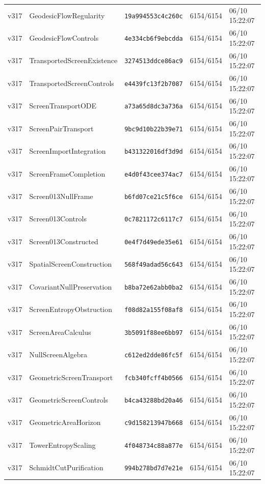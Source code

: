 \documentclass[11pt]{article}
\theoremstyle{definition}\newtheorem{deriv}{Derivação}
\begin{document}
{\begin{longtable}{@{}lllll@{}}
v317 & GeodesicFlowRegularity & \texttt{19a994553c4c260c} & 6154/6154 & 06/10 15:22:07 \\
v317 & GeodesicFlowControls & \texttt{4e334cb6f9ebcdda} & 6154/6154 & 06/10 15:22:07 \\
v317 & TransportedScreenExistence & \texttt{3274513ddce86ac9} & 6154/6154 & 06/10 15:22:07 \\
v317 & TransportedScreenControls & \texttt{e4439fc13f2b7087} & 6154/6154 & 06/10 15:22:07 \\
v317 & ScreenTransportODE & \texttt{a73a65d8dc3a736a} & 6154/6154 & 06/10 15:22:07 \\
v317 & ScreenPairTransport & \texttt{9bc9d10b22b39e71} & 6154/6154 & 06/10 15:22:07 \\
v317 & ScreenImportIntegration & \texttt{b431322016df3d9d} & 6154/6154 & 06/10 15:22:07 \\
v317 & ScreenFrameCompletion & \texttt{e4d0f43cee374ac7} & 6154/6154 & 06/10 15:22:07 \\
v317 & Screen013NullFrame & \texttt{b6fd07ce21c5f6ce} & 6154/6154 & 06/10 15:22:07 \\
v317 & Screen013Controls & \texttt{0c7821172c6117c7} & 6154/6154 & 06/10 15:22:07 \\
v317 & Screen013Constructed & \texttt{0e4f7d49ede35e61} & 6154/6154 & 06/10 15:22:07 \\
v317 & SpatialScreenConstruction & \texttt{568f49adad56c643} & 6154/6154 & 06/10 15:22:07 \\
v317 & CovariantNullPreservation & \texttt{b8ba72e62abb0ba2} & 6154/6154 & 06/10 15:22:07 \\
v317 & ScreenEntropyObstruction & \texttt{f08d82a155f08af8} & 6154/6154 & 06/10 15:22:07 \\
v317 & ScreenAreaCalculus & \texttt{3b5091f88ee6bb97} & 6154/6154 & 06/10 15:22:07 \\
v317 & NullScreenAlgebra & \texttt{c612ed2dde86fc5f} & 6154/6154 & 06/10 15:22:07 \\
v317 & GeometricScreenTransport & \texttt{fcb340fcff4b0566} & 6154/6154 & 06/10 15:22:07 \\
v317 & GeometricScreenControls & \texttt{b4ca43288bd20a46} & 6154/6154 & 06/10 15:22:07 \\
v317 & GeometricAreaHorizon & \texttt{c9d158213947b668} & 6154/6154 & 06/10 15:22:07 \\
v317 & TowerEntropyScaling & \texttt{4f048734c88a877e} & 6154/6154 & 06/10 15:22:07 \\
v317 & SchmidtCutPurification & \texttt{994b278bd7d7e21e} & 6154/6154 & 06/10 15:22:07 \\

\end{longtable}}
\end{document}
